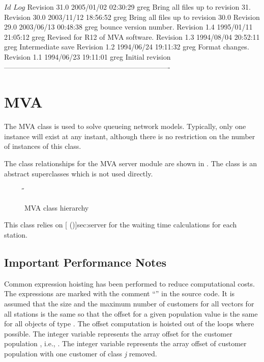 \C 
\C $Id$
\C 
\C $Log$
\C Revision 31.0  2005/01/02 02:30:29  greg
\C Bring all files up to revision 31.
\C
\C Revision 30.0  2003/11/12 18:56:52  greg
\C Bring all files up to revision 30.0
\C
\C Revision 29.0  2003/06/13 00:48:38  greg
\C bounce version number.
\C
\C Revision 1.4  1995/01/11 21:05:12  greg
\C Revised for R12 of MVA software.
\C
\C Revision 1.3  1994/08/04  20:52:11  greg
\C Intermediate save
\C
\C Revision 1.2  1994/06/24  19:11:32  greg
\C Format changes.
\C
\C Revision 1.1  1994/06/23  19:11:01  greg
\C Initial revision
\C
\C ----------------------------------------------------------------------
\section{MVA}
\label{sec:mva}

The MVA class is used to solve queueing network models.  Typically,
only one instance will exist at any instant, although there is no
restriction on the number of instances of this class.

The class relationships for the MVA server module are shown in
.  The class  is an abstract
superclasses which is not used directly.

\begin{figure}[htbp]
  \label{fig:mva}
  \begin{center}
    \T \tex \leavevmode 
    \caption{MVA class hierarchy}
    \H {}
  \end{center}
\end{figure}

This class relies on [ (\Sec\Ref)]{sec:server} for the waiting
time calculations for each station.

\htmlrule
\subsection{Important Performance Notes}
\label{sec:mva-cautions}

Common expression hoisting has been performed to reduce computational
costs.  The expressions are marked with the comment ``''
in the source code.  It is assumed that the size and the maximum
number of customers for all 
vectors for all stations is the same so that the offset for a given
population value  is the same for all objects of type
.  The offset computation is hoisted out of the loops
where possible.  The integer variable  represents the array
offset for the customer population , i.e., .  The integer variable  represents
the array offset of customer population  with one customer of
class \emph{j} removed.  

